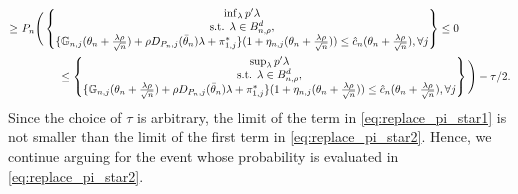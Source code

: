 \documentclass[letterpaper,11pt]{article}
\theoremstyle{myplain}
\theoremstyle{mydefinition}
\theoremstyle{myremark}
\newcommand{\larhon}{\frac{\lambda \rho }{\sqrt n}}
\numberwithin{equation}{section}
\numberwithin{figure}{section}
\begin{document}
\begin{appendices}
\begin{align}
	\ge &~P_n \Bigg( \begin{Bmatrix} \inf_{\lambda} p^\prime\lambda     \\ \text{s.t. } \lambda\in B^d_{n,\rho},  \\ \{\mathbb G_{n,j}(\theta_n+\larhon)+\rho D_{P_n,j}(\bar\theta_n)\lambda+ \pi_{1,j}^*\}(1+\eta_{n,j}(\theta_n+\larhon))\le  \hat{c}_n(\theta_n+\larhon), \forall j    \end{Bmatrix} \leq 0  \notag\\
	&\hspace{0.5in}\leq\begin{Bmatrix} \sup_{\lambda} p'\lambda     \\ \text{s.t. } \lambda\in B^d_{n,\rho},  \\ \{\mathbb G_{n,j}(\theta_n+\larhon)+\rho D_{P_n,j}(\bar\theta_n)\lambda+\pi_{1,j}^*\}(1+\eta_{n,j}(\theta_n+\larhon))\le  \hat{c}_n(\theta_n+\larhon), \forall j   \end{Bmatrix}\Bigg)-\tau/2.\label{eq:replace_pi_star2}
	\end{align}
	Since the choice of $\tau$ is arbitrary, the limit of the term in \eqref{eq:replace_pi_star1} is not smaller than the limit of the first term in \eqref{eq:replace_pi_star2}.
Hence, we continue arguing for the event whose probability is evaluated in \eqref{eq:replace_pi_star2}. 











\end{appendices}
\end{document}
